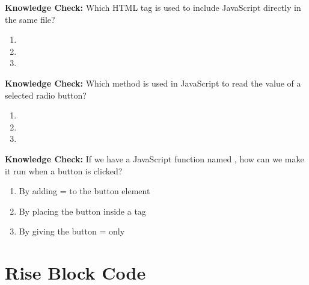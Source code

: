 \documentclass{article}
\begin{document}
\vspace{0.5cm}

\textbf{Knowledge Check:} Which HTML tag is used to include JavaScript directly in the same file?

\begin{enumerate}[label=\Alph*), topsep=4pt, itemsep=2pt, partopsep=0pt]
  \item {}
  \item {}
  \item {}
\end{enumerate}

\vspace{0.5cm}

\textbf{Knowledge Check:} Which method is used in JavaScript to read the value of a selected radio button?

\begin{enumerate}[label=\Alph*), topsep=4pt, itemsep=2pt, partopsep=0pt]
  \item {}
  \item {}
  \item {}
\end{enumerate}

\vspace{0.5cm}

\textbf{Knowledge Check:} If we have a JavaScript function named , how can we make it run when a button is clicked?

\begin{enumerate}[label=\Alph*), topsep=4pt, itemsep=2pt, partopsep=0pt]
  \item By adding = to the button element
  \item By placing the button inside a  tag
  \item By giving the button = only
\end{enumerate}

\vspace{0.5cm}

\section*{\Bitter\textcolor{naranja}{Rise Block Code}}
\label{sec:rise-block-code}
\end{document}

